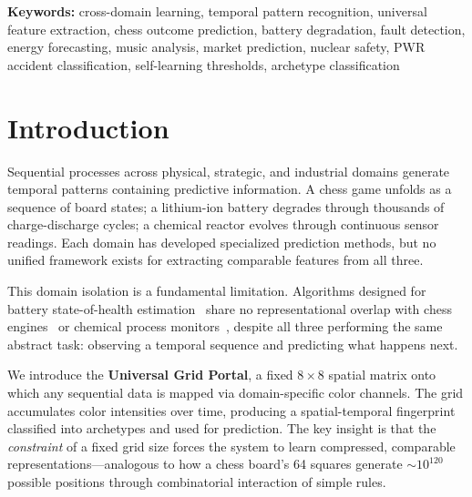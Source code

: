 \documentclass[12pt,a4paper]{article}
\begin{document}
\begin{abstract}
independently matching TEP discovery).
The system incorporates self-learning signal calibration---automatically learning outcome
distributions, fusion weights, and confidence curves from accumulated data---with accuracy
improving with volume and no architectural changes. A critical cross-domain finding: two
physically unrelated safety systems (chemical reactor TEP and pressurized water reactor NPPAD)
independently converge to the same optimal discrimination threshold ($z{>}3.0$) through the same
self-learning algorithm, suggesting a universal property of physical anomaly signatures. These
results support the hypothesis that temporal patterns across fundamentally different physical
processes can be captured by a single, constrained spatial representation.
\end{abstract}

\noindent\textbf{Keywords:} cross-domain learning, temporal pattern recognition, universal feature
extraction, chess outcome prediction, battery degradation, fault detection, energy forecasting,
music analysis, market prediction, nuclear safety, PWR accident classification, self-learning
thresholds, archetype classification

\tableofcontents
\newpage

\section{Introduction}

Sequential processes across physical, strategic, and industrial domains generate temporal patterns
containing predictive information. A chess game unfolds as a sequence of board states; a
lithium-ion battery degrades through thousands of charge-discharge cycles; a chemical reactor
evolves through continuous sensor readings. Each domain has developed specialized prediction
methods, but no unified framework exists for extracting comparable features from all three.

This domain isolation is a fundamental limitation. Algorithms designed for battery state-of-health
estimation~\cite{severson2019} share no representational overlap with chess
engines~\cite{stockfish} or chemical process monitors~\cite{tep1993}, despite all three performing
the same abstract task: observing a temporal sequence and predicting what happens next.

We introduce the \textbf{Universal Grid Portal}, a fixed $8{\times}8$ spatial matrix onto which
any sequential data is mapped via domain-specific color channels. The grid accumulates color
intensities over time, producing a spatial-temporal fingerprint classified into archetypes and used
for prediction. The key insight is that the \emph{constraint} of a fixed grid size forces the
system to learn compressed, comparable representations---analogous to how a chess board's 64
squares generate ${\sim}10^{120}$ possible positions through combinatorial interaction of simple
rules.
\end{document}
